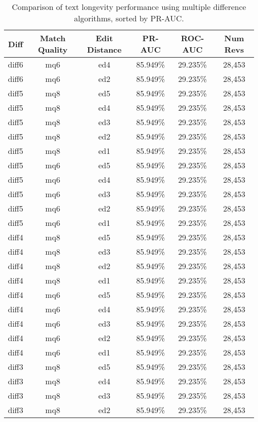 \begin{table}[tbph]
\begin{center}
\begin{tabular}{|c|c|c||c|c|c|}
\hline
Diff & Match Quality & Edit Distance & PR-AUC & ROC-AUC & Num Revs \\
\hline
\hline
diff6 & mq6 & ed4 & 85.949\% & 29.235\% & 28,453 \\
diff6 & mq6 & ed2 & 85.949\% & 29.235\% & 28,453 \\
diff5 & mq8 & ed5 & 85.949\% & 29.235\% & 28,453 \\
diff5 & mq8 & ed4 & 85.949\% & 29.235\% & 28,453 \\
diff5 & mq8 & ed3 & 85.949\% & 29.235\% & 28,453 \\
diff5 & mq8 & ed2 & 85.949\% & 29.235\% & 28,453 \\
diff5 & mq8 & ed1 & 85.949\% & 29.235\% & 28,453 \\
diff5 & mq6 & ed5 & 85.949\% & 29.235\% & 28,453 \\
diff5 & mq6 & ed4 & 85.949\% & 29.235\% & 28,453 \\
diff5 & mq6 & ed3 & 85.949\% & 29.235\% & 28,453 \\
diff5 & mq6 & ed2 & 85.949\% & 29.235\% & 28,453 \\
diff5 & mq6 & ed1 & 85.949\% & 29.235\% & 28,453 \\
diff4 & mq8 & ed5 & 85.949\% & 29.235\% & 28,453 \\
diff4 & mq8 & ed3 & 85.949\% & 29.235\% & 28,453 \\
diff4 & mq8 & ed2 & 85.949\% & 29.235\% & 28,453 \\
diff4 & mq8 & ed1 & 85.949\% & 29.235\% & 28,453 \\
diff4 & mq6 & ed5 & 85.949\% & 29.235\% & 28,453 \\
diff4 & mq6 & ed4 & 85.949\% & 29.235\% & 28,453 \\
diff4 & mq6 & ed3 & 85.949\% & 29.235\% & 28,453 \\
diff4 & mq6 & ed2 & 85.949\% & 29.235\% & 28,453 \\
diff4 & mq6 & ed1 & 85.949\% & 29.235\% & 28,453 \\
diff3 & mq8 & ed5 & 85.949\% & 29.235\% & 28,453 \\
diff3 & mq8 & ed4 & 85.949\% & 29.235\% & 28,453 \\
diff3 & mq8 & ed3 & 85.949\% & 29.235\% & 28,453 \\
diff3 & mq8 & ed2 & 85.949\% & 29.235\% & 28,453 \\
\hline
\end{tabular}
\end{center}
\caption{Comparison of text longevity performance using
    multiple difference algorithms, sorted by PR-AUC.}
\label{tab:textshoutG}
\end{table}
